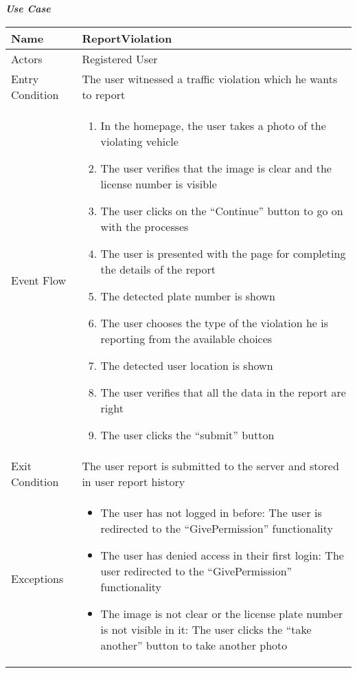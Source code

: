 \emph{\textbf{Use Case}}

\begin{table}[!hbtp]
\footnotesize
\centering
\settowidth{}
\setlength\extrarowheight{2pt}
\begin{tabulary}{\textwidth}{|J|J|}
\hline
Name            & ReportViolation \\
\hline
Actors          & Registered User \\
\hline
Entry Condition & The user witnessed a traffic violation which he wants to report \\
\hline
Event Flow      & 
\begin{minipage}[t]{0.7\textwidth}
\begin{enumerate} 
\item In the homepage, the user takes a photo of the violating vehicle
\item The user verifies that the image is clear and the license number is visible
\item The user clicks on the “Continue” button to go on with the processes
\item The user is presented with the page for completing the details of the report
\item The detected plate number is shown
\item The user chooses the type of the violation he is reporting from the available choices
\item The detected user location is shown
\item The user verifies that all the data in the report are right
\item The user clicks the “submit” button
\end{enumerate}
\end{minipage}\\
\hline
Exit Condition  & The user report is submitted to the server and stored in user report history \\
\hline
Exceptions      & 
\begin{minipage}[t]{0.8\textwidth}
\begin{itemize} 
\item The user has not logged in before: The user is redirected to the “GivePermission” functionality
\item The user has denied access in their first login:   The user redirected to the “GivePermission” functionality
\item The image is not clear or the license plate number is not visible in it: The user clicks the “take another” button to take another photo

\end{itemize}
\end{minipage}
\end{tabulary}
\end{table}
